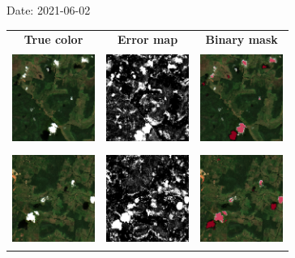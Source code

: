 \documentclass{beamer}
\begin{document}
\begin{frame}{Date: 2021-06-02}
    \begin{tabular}{ccc}
        \textbf{True color} & \textbf{Error map} & \textbf{Binary mask}\\
        \includegraphics[width=2.7cm,height=3cm]{Figures/v6/20210602/TCI_zoom3.png}& \includegraphics[width=2.7cm,height=3cm]{Figures/v6/20210602/error_map_zoom3.png} &\includegraphics[width=2.7cm,height=3cm]{Figures/v6/20210602/zoom3_BI.png}\\
        \includegraphics[width=2.7cm,height=3cm]{Figures/v6/20210602/TCI_zoom4.png}& \includegraphics[width=2.7cm,height=3cm]{Figures/v6/20210602/error_map_zoom4.png} &\includegraphics[width=2.7cm,height=3cm]{Figures/v6/20210602/zoom4_BI.png}\\
        \end{tabular}
\end{frame}
\end{document}
